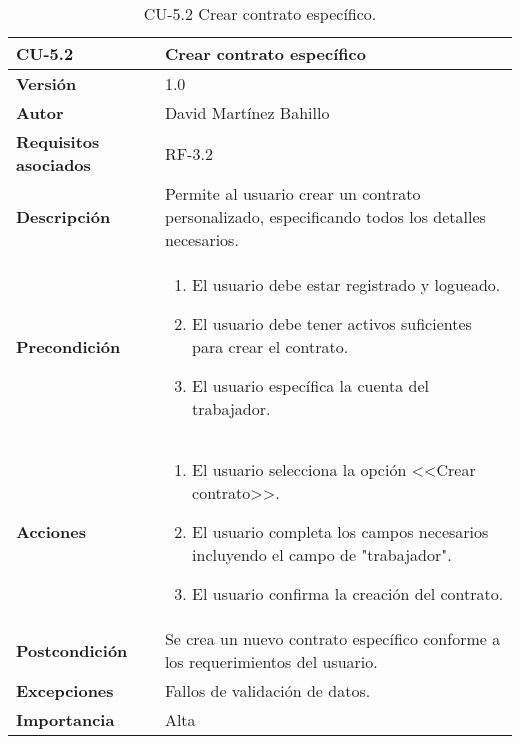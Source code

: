 \begin{table}[p]
	\centering
	\begin{tabularx}{\linewidth}{ p{} p{} }
		\toprule
		\textbf{CU-5.2}  & \textbf{Crear contrato específico}\\
		\midrule
		\textbf{Versión}              & 1.0    \\
		\textbf{Autor}                & David Martínez Bahillo \\
		\textbf{Requisitos asociados} & RF-3.2 \\
		\textbf{Descripción}          & Permite al usuario crear un contrato personalizado, especificando todos los detalles necesarios. \\
		\textbf{Precondición}         &  
		\begin{enumerate}
			\def\labelenumi{\arabic{enumi}.}
			\tightlist
			\item El usuario debe estar registrado y logueado.
			\item El usuario debe tener activos suficientes para crear el contrato.
			\item El usuario específica la cuenta del trabajador.
		\end{enumerate}\\
		\textbf{Acciones}             &
		\begin{enumerate}
			\def\labelenumi{\arabic{enumi}.}
			\tightlist
			\item El usuario selecciona la opción <<Crear contrato>>.
			\item El usuario completa los campos necesarios incluyendo el campo de "trabajador".
			\item El usuario confirma la creación del contrato.
		\end{enumerate}\\
		\textbf{Postcondición}        & Se crea un nuevo contrato específico conforme a los requerimientos del usuario. \\
		\textbf{Excepciones}          & Fallos de validación de datos. \\
		\textbf{Importancia}          & Alta  \\
		\bottomrule
	\end{tabularx}
	\caption{CU-5.2 Crear contrato específico.}
\end{table}


